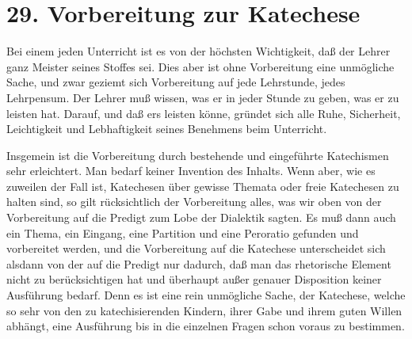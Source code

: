 \section{29. Vorbereitung zur Katechese}

Bei einem jeden Unterricht ist es von der höchsten Wichtigkeit, daß der Lehrer ganz Meister seines Stoffes sei. Dies aber ist ohne Vorbereitung eine unmögliche Sache, und zwar geziemt sich Vorbereitung auf jede Lehrstunde, jedes Lehrpensum. Der Lehrer muß wissen, was er in jeder Stunde zu geben, was er zu leisten hat. Darauf, und daß ers leisten könne, gründet sich alle Ruhe, Sicherheit, Leichtigkeit und Lebhaftigkeit seines Benehmens beim Unterricht.

Insgemein ist die Vorbereitung durch bestehende und eingeführte Katechismen sehr erleichtert. Man bedarf keiner Invention des Inhalts. Wenn aber, wie es zuweilen der Fall ist, Katechesen über gewisse Themata oder freie Katechesen zu halten sind, so gilt rücksichtlich der Vorbereitung alles, was wir oben von der Vorbereitung auf die Predigt zum Lobe der Dialektik sagten. Es muß dann auch ein Thema, ein Eingang, eine Partition und eine Peroratio gefunden und vorbereitet werden, und die Vorbereitung auf die Katechese unterscheidet sich alsdann von der auf die Predigt nur dadurch, daß man das rhetorische Element nicht zu berücksichtigen hat und überhaupt außer genauer Disposition keiner Ausführung bedarf. Denn es ist eine rein unmögliche Sache, der Katechese, welche so sehr von den zu katechisierenden Kindern, ihrer Gabe und ihrem guten Willen abhängt, eine Ausführung bis in die einzelnen Fragen schon voraus zu bestimmen.

